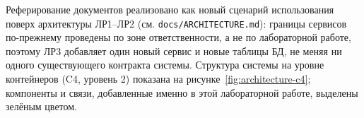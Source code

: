 

Реферирование документов реализовано как новый сценарий использования
поверх архитектуры ЛР1--ЛР2 (см. \texttt{docs/ARCHITECTURE.md}):
границы сервисов по-прежнему проведены по зоне ответственности, а не по
лабораторной работе, поэтому ЛР3 добавляет один новый сервис и новые
таблицы БД, не меняя ни одного существующего контракта системы.
Структура системы на уровне контейнеров (C4, уровень 2) показана на
рисунке~\ref{fig:architecture-c4}; компоненты и связи, добавленные
именно в этой лабораторной работе, выделены зелёным цветом.


